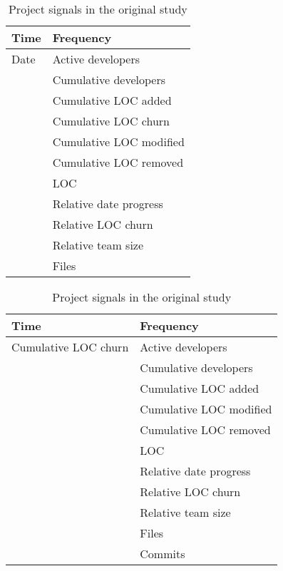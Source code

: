 \begin{table}[H]
\caption{Project signals in the original study}\label{table:karus_series}
\centering
\begin{tabular}{ll}
	\hline
	\bfseries{Time}\rm & \bfseries{Frequency}\rm \\
	\hline
	Date & Active developers \\
	& Cumulative developers \\
	& Cumulative LOC added \\
	& Cumulative LOC churn \\
	& Cumulative LOC modified \\
	& Cumulative LOC removed \\
	& LOC \\
	& Relative date progress \\
	& Relative LOC churn \\
	& Relative team size \\
	& Files \\
	\hline
\end{tabular}
\hspace{1em}
\begin{tabular}{ll}
	\hline
	\bfseries{Time}\rm & \bfseries{Frequency}\rm \\
	\hline
	Cumulative LOC churn & Active developers \\
	& Cumulative developers \\
	& Cumulative LOC added \\
	& Cumulative LOC modified \\
	& Cumulative LOC removed \\
	& LOC \\
	& Relative date progress \\
	& Relative LOC churn \\
	& Relative team size \\
	& Files \\
	& Commits \\
	\hline
\end{tabular}
\end{table}